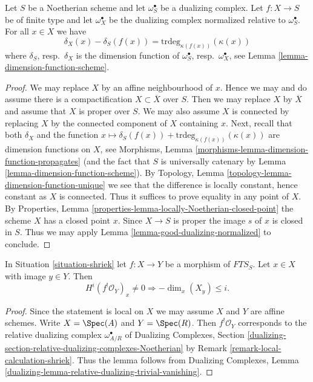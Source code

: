 \begin{lemma}
\label{lemma-good-dualizing-dimension-function}
Let $S$ be a Noetherian scheme and let $\omega_S^\bullet$ be a
dualizing complex. Let $f : X \to S$ be of finite type
and let $\omega_X^\bullet$ be the dualizing complex
normalized relative to $\omega_S^\bullet$. For all $x \in X$ we have
$$
\delta_X(x) - \delta_S(f(x)) = \text{trdeg}_{\kappa(f(x))}(\kappa(x))
$$
where $\delta_S$, resp.\ $\delta_X$
is the dimension function of
$\omega_S^\bullet$, resp.\ $\omega_X^\bullet$, see
Lemma \ref{lemma-dimension-function-scheme}.
\end{lemma}

\begin{proof}
We may replace $X$ by an affine neighbourhood of $x$. Hence we may
and do assume there is a compactification $X \subset \overline{X}$
over $S$. Then we may replace $X$ by $\overline{X}$ and assume
that $X$ is proper over $S$. We may also assume $X$ is connected
by replacing $X$ by the connected component of $X$ containing $x$.
Next, recall that both $\delta_X$ and the function
$x \mapsto \delta_S(f(x)) + \text{trdeg}_{\kappa(f(x))}(\kappa(x))$
are dimension functions on $X$, see
Morphisms, Lemma \ref{morphisms-lemma-dimension-function-propagates}
(and the fact that $S$ is universally catenary by
Lemma \ref{lemma-dimension-function-scheme}).
By Topology, Lemma \ref{topology-lemma-dimension-function-unique}
we see that the difference is locally constant, hence constant as $X$ is
connected. Thus it suffices to prove equality in any point of $X$.
By Properties, Lemma \ref{properties-lemma-locally-Noetherian-closed-point}
the scheme $X$ has a closed point $x$. Since $X \to S$ is proper
the image $s$ of $x$ is closed in $S$. Thus we may apply
Lemma \ref{lemma-good-dualizing-normalized} to conclude.
\end{proof}

\begin{lemma}
\label{lemma-shriek}
In Situation \ref{situation-shriek} let $f : X \to Y$ be a morphism of
$\textit{FTS}_S$. Let $x \in X$ with image $y \in Y$. Then
$$
H^i(f^!\mathcal{O}_Y)_x \not = 0
\Rightarrow - \dim_x(X_y) \leq i.
$$
\end{lemma}

\begin{proof}
Since the statement is local on $X$ we may assume $X$
and $Y$ are affine schemes. Write
$X = \Spec(A)$ and $Y = \Spec(R)$.
Then $f^!\mathcal{O}_Y$ corresponds to the relative dualizing
complex $\omega_{A/R}^\bullet$ of
Dualizing Complexes, Section
\ref{dualizing-section-relative-dualizing-complexes-Noetherian}
by Remark \ref{remark-local-calculation-shriek}.
Thus the lemma follows from Dualizing Complexes, Lemma
\ref{dualizing-lemma-relative-dualizing-trivial-vanishing}.
\end{proof}

